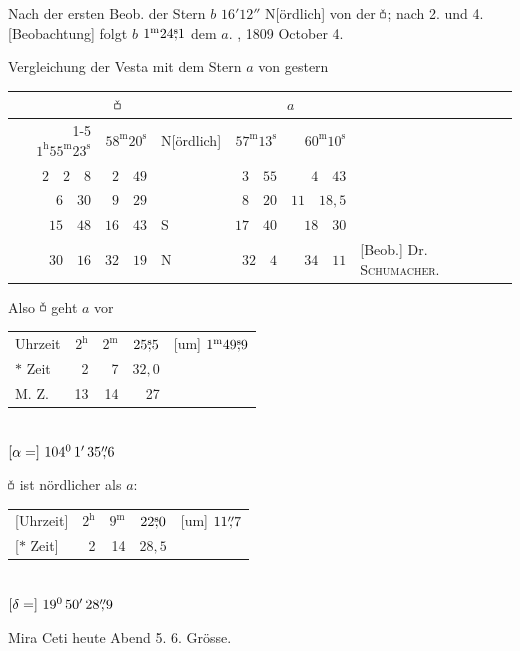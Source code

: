 \noindent\hspace*{\parindent}Nach der ersten Beob. der Stern $b$ $16'12''$ N[ördlich] von der $\ObsVesta$; nach 2. und 4. [Beobachtung] folgt $b$ $1^{\mathrm m}24\mathord{\overset{\mathrm{s}}{,}}1$ dem $a$.
\medskip{}, 1809 October 4.

Vergleichung der Vesta mit dem Stern $a$ von gestern
\begin{center}\small\setlength{\tabcolsep}{3pt}\renewcommand{\arraystretch}{1.2}
\begin{tabular}{r r l|r r l}
\multicolumn{3}{c}{$\ObsVesta$}&\multicolumn{2}{c}{$a$}&\\\cline{1-5}
$1^{\mathrm h}55^{\mathrm m}23^{\mathrm s}$&$58^{\mathrm m}20^{\mathrm s}$&N[ördlich]&$57^{\mathrm m}13^{\mathrm s}$&$60^{\mathrm m}10^{\mathrm s}$&\\
$2\quad2\quad8$&$2\quad49$&&$3\quad55$&$4\quad43$&\\
$6\quad30$&$9\quad29$&&$8\quad20$&$11\quad18{,}5$&\\
$15\quad48$&$16\quad43$&S&$17\quad40$&$18\quad30$&\\
$30\quad16$&$32\quad19$&N&$32\quad4$&$34\quad11$&[Beob.] Dr. \textsc{Schumacher}.
\end{tabular}
\end{center}
\clearpage{}
\begin{center}\small
\begin{minipage}[t]{.49\linewidth}\centering
Also $\ObsVesta$ geht $a$ vor\\[.4em]
\setlength{\tabcolsep}{2pt}\begin{tabular}{lrrrl}
Uhrzeit&$2^{\mathrm h}$&$2^{\mathrm m}$&$25\mathord{\overset{\mathrm{s}}{,}}5$&[um] $1^{\mathrm m}49\mathord{\overset{\mathrm{s}}{,}}9$\\
$\ast$ Zeit&2&7&$32{,}0$&\\
M. Z.&13&14&27&
\end{tabular}\\[.5em]
$[\alpha=]\ 104^0\,1'\,\ObsArc{35}6$
\end{minipage}\hfill
\begin{minipage}[t]{.49\linewidth}\centering
$\ObsVesta$ ist nördlicher als $a$:\\[.4em]
\setlength{\tabcolsep}{2pt}\begin{tabular}{lrrrl}
{}[Uhrzeit]&$2^{\mathrm h}$&$9^{\mathrm m}$&$22\mathord{\overset{\mathrm{s}}{,}}0$&[um] $11\mathord{\overset{\prime\prime}{,}}7$\\
{}[$\ast$ Zeit]&2&14&$28{,}5$&
\end{tabular}\\[1.7em]
$[\delta=]\ 19^0\,50'\,\ObsArc{28}9$
\end{minipage}
\end{center}
\noindent\hspace*{\parindent}Mira Ceti heute Abend 5. 6. Grösse.
\clearpage\endgroup
